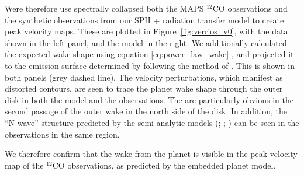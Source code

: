 Were therefore use spectrally collapsed both the MAPS $^{12}$CO observations \citep{oberg2021} and the synthetic observations from our SPH + radiation transfer model to create peak velocity maps.
These are plotted in Figure~\ref{fig:verrios_v0}, with the data shown in the left panel, and the model in the right.
We additionally calculated the expected wake shape using equation \ref{eq:power_law_wake} \citep{ogilvie2002,rafikov2002a}, and projected it to the emission surface determined by \citet{law2021a} following the method of \citet{calcino2022}.
This is shown in both panels (grey dashed line).
The velocity perturbations, which manifest as distorted contours, are seen to trace the planet wake shape through the outer disk in both the model and the observations.
The are particularly obvious in the second passage of the outer wake in the north side of the disk.
In addition, the ``N-wave'' structure predicted by the semi-analytic models (\citealt{goodman2001}; \citealt{rafikov2002a}; ) can be seen in the observations in the same region.

We therefore confirm that the wake from the planet is visible in the peak velocity map of the $^{12}$CO observations, as predicted by the embedded planet model.
